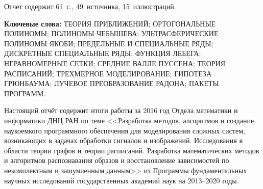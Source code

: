 \Referat %

Отчет содержит 61~с., 49~источника, 15~иллюстраций.

 \bigskip
 \textbf{ Ключевые
  слова:}
  ТЕОРИЯ ПРИБЛИЖЕНИЙ; ОРТОГОНАЛЬНЫЕ ПОЛИНОМЫ; ПОЛИНОМЫ ЧЕБЫШЕВА; УЛЬТРАСФЕРИЧЕСКИЕ ПОЛИНОМЫ ЯКОБИ; ПРЕДЕЛЬНЫЕ И СПЕЦИАЛЬНЫЕ РЯДЫ; ДИСКРЕТНЫЕ СПЕЦИАЛЬНЫЕ РЯДЫ; ФУНКЦИЯ ЛЕБЕГА; НЕРАВНОМЕРНЫЕ СЕТКИ; СРЕДНИЕ ВАЛЛЕ ПУССЕНА; ТЕОРИЯ РАСПИСАНИЙ; ТРЕХМЕРНОЕ МОДЕЛИРОВАНИЕ; ГИПОТЕЗА ГРЮНБАУМА; ЛУЧЕВОЕ ПРЕОБРАЗОВАНИЕ РАДОНА; ПАКЕТЫ ПРОГРАММ.


 \bigskip

Настоящий отчёт содержит итоги работы за 2016 год Отдела математики и информатики ДНЦ РАН по теме
<<Разработка методов, алгоритмов и создание наукоемкого программного обеспечения для моделирования сложных систем, возникающих в задачах обработки сигналов и изображений. Исследования в области теории графов и теории расписаний.
Разработка математических методов и алгоритмов распознавания образов и восстановление зависимостей по некомплектным и зашумленным данным>>
из Программы фундаментальных научных исследований государственных академий наук на 2013–2020 годы.




